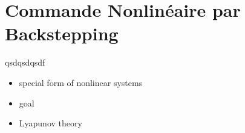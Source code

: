 \graphicspath{{Figures/}}
\chapter{Commande Nonlinéaire par Backstepping} \label{chap:backstepping}
qsdqsdqsdf
\begin{itemize}
	\item special form of nonlinear systems
	\item goal
	\item Lyapunov theory
	
\end{itemize}